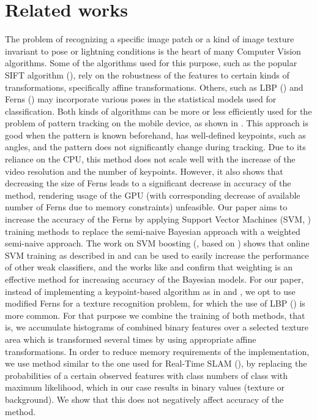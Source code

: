 \documentclass[10pt,twocolumn, a4paper]{article}
\begin{document}
\section{Related works}
\label{Related}
 The problem of recognizing a specific image patch or a kind of image texture invariant to pose or lightning conditions is the heart of many Computer Vision algorithms. Some of the algorithms used for this purpose, such as the popular SIFT algorithm (\cite{sift}), rely on the robustness of the features to certain kinds of transformations, specifically affine transformations. Others, such as LBP (\cite{LBP}) and Ferns (\cite{Ferns1}) may incorporate various poses in the statistical models used for classification.
Both kinds of algorithms can be more or less efficiently used for the problem of pattern tracking on the mobile device, as shown in \cite{Mobi}. This approach is good when the pattern is known beforehand, has well-defined keypoints, such as angles, and the pattern does not significantly change during tracking. Due to its reliance on the CPU, this method does not scale well with the increase of the video resolution and the number of keypoints. However, it also shows that decreasing the size of Ferns leads to a significant decrease in accuracy of the method, rendering usage of the GPU (with corresponding decrease of available number of Ferns due to memory constraints) unfeasible.
Our paper aims to increase the accuracy of the Ferns by applying Support Vector Machines (SVM, \cite{Vapnik}) training methods to replace the semi-naive Bayesian approach with a weighted semi-naive approach. The work on SVM boosting (\cite{Seva}, based on \cite{AdaBoost}) shows that online SVM training as described in \cite{Norma} and \cite{Pegasos} can be used to easily increase the performance of other weak classifiers, and the works like \cite{wb1} and \cite{wb2} confirm that weighting is an effective method for increasing accuracy of the Bayesian models. 
For our paper, instead of implementing a keypoint-based algorithm as in \cite{Ferns1} and \cite{sift}, we opt to use modified Ferns for a texture recognition problem, for which the use of LBP (\cite{LBP}) is more common. For that purpose we combine the training of both methods, that is, we accumulate histograms of combined binary features over a selected texture area which is transformed several times by using appropriate affine transformations.
In order to reduce memory requirements of the implementation, we use method similar to the one used for Real-Time SLAM (\cite{slam}), by replacing the probabilities of a certain observed features with class numbers of class with maximum likelihood, which in our case results in binary values (texture or background). We show that this does not negatively affect accuracy of the method.
\end{document}
